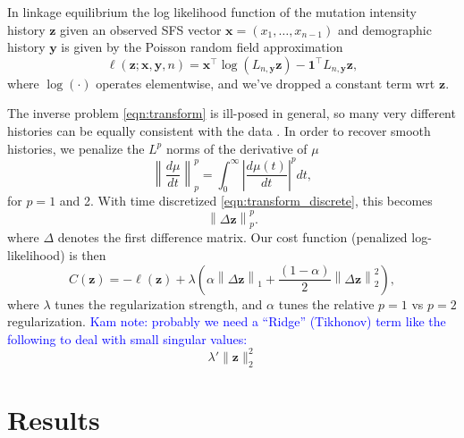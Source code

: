 \documentclass[11pt]{article}
\begin{document}
In linkage equilibrium the log likelihood function of the mutation intensity history $\boldsymbol z$ given an observed SFS vector $\boldsymbol x = (x_1,\dots,x_{n-1})$ and demographic history $\boldsymbol y$ is given by the Poisson random field approximation \citep{}
\[
\ell(\boldsymbol z; \boldsymbol x, \boldsymbol y, n) = \boldsymbol x^\intercal\log(L_{n, \boldsymbol y} \boldsymbol z) - \boldsymbol 1^\intercal L_{n, \boldsymbol y} \boldsymbol z,
\]
where $\log(\cdot)$ operates elementwise, and we've dropped a constant term wrt $\boldsymbol z$.

The inverse problem \eqref{eqn:transform} is ill-posed in general, so many very different histories can be equally consistent with the data \citep{oscillation paper? Yun's other papers?}.
In order to recover smooth histories,
we penalize the $L^p$ norms
of the derivative of $\mu$
\[
\left\| \frac{d \mu}{d t} \right\|_p^p
= \int_0^\infty\left|\frac{d\mu(t)}{dt}\right|^p dt,
\]
for $p=1$ and 2.
With time discretized \eqref{eqn:transform_discrete},
this becomes
\[
\left\|\Delta\boldsymbol z \right\|_p^p.
\]
where $\Delta$ denotes the first difference matrix.
Our cost function (penalized log-likelihood) is then
\begin{equation}
\label{eqn:penalized}
C(\bm z)
= -\ell(\boldsymbol z) + \lambda \left(\alpha\left\|\Delta\boldsymbol z\right\|_1 + \frac{(1-\alpha)}{2}\left\|\Delta\boldsymbol z\right\|_2^2\right),
\end{equation}
where $\lambda$ tunes the regularization strength, and $\alpha$ tunes the relative $p=1$ vs $p=2$ regularization.
\textcolor{blue}{Kam note: probably we need a ``Ridge'' (Tikhonov)
term like the following to deal with small singular values:}
\[
\lambda' \| \bm z \|_2^2
\]


\section*{Results}\label{sec:results}

\end{document}
